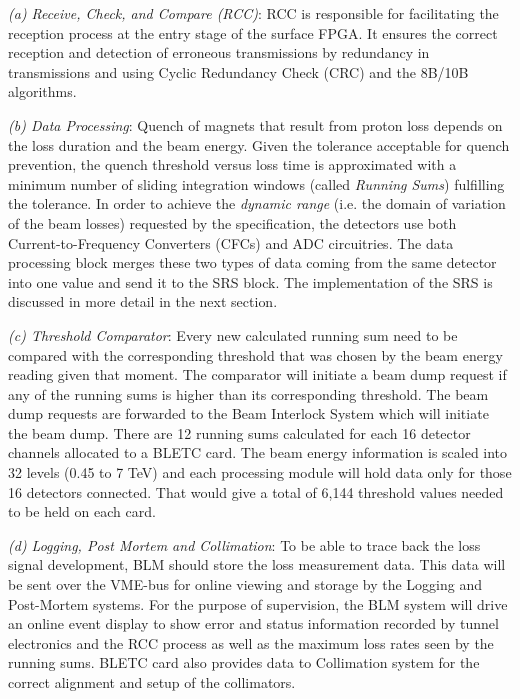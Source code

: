 \documentclass{llncs}
\begin{document}
\emph{(a) Receive, Check, and Compare (RCC)}: RCC is responsible for facilitating the reception process at the entry stage of the surface FPGA. It ensures the correct reception and detection of erroneous transmissions by redundancy in transmissions and using Cyclic Redundancy Check (CRC) and the 8B/10B algorithms.

\emph{(b) Data Processing}: Quench of magnets that result from proton loss depends on the loss duration and the beam energy. Given the tolerance acceptable for quench prevention, the quench threshold versus loss time is approximated with a minimum number of sliding integration windows (called \emph{Running Sums}) fulfilling the tolerance. In order to achieve the \emph{dynamic range} (i.e. the domain of variation of the beam losses) requested by the specification, the detectors use both Current-to-Frequency Converters (CFCs) and ADC circuitries. The data processing block merges these two types of data coming from the same detector into one value and send it to the SRS block. The implementation of the SRS is discussed in more detail in the next section.

\emph{(c) Threshold Comparator}: Every new calculated running sum need to be compared with the corresponding threshold that was chosen by the beam energy reading given that moment. The comparator will initiate a beam dump request if any of the running sums is higher than its corresponding threshold. The beam dump requests are forwarded to the Beam Interlock System which will initiate the beam dump. There are 12 running sums calculated for each 16 detector channels allocated to a BLETC card. The beam energy information is scaled into 32 levels (0.45 to 7 TeV) and each processing module will hold data only for those 16 detectors connected. That would give a total of 6,144 threshold values needed to be held on each card.

\emph{(d) Logging, Post Mortem and Collimation}:  To be able to trace back the loss signal development, BLM should store the loss measurement data. This data will be sent over the VME-bus for online viewing and storage by the Logging and Post-Mortem systems. For the purpose of supervision, the BLM system will drive an online event display to show error and status information recorded by tunnel electronics and the RCC process as well as the maximum loss rates seen by the running sums. BLETC card also provides data to Collimation system for the correct alignment and setup of the collimators.
\end{document}
